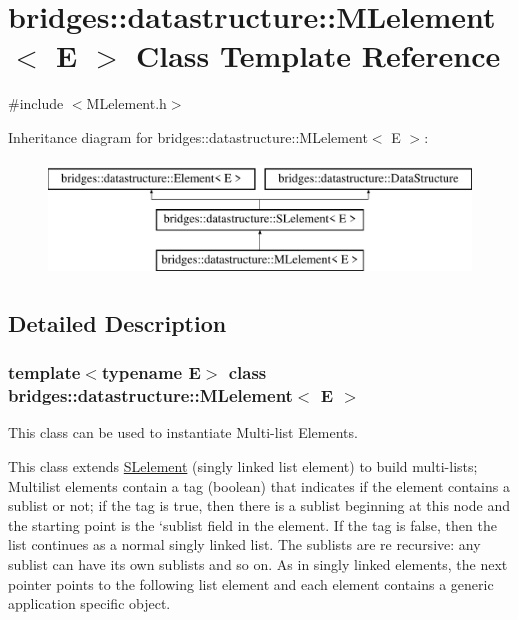 \hypertarget{classbridges_1_1datastructure_1_1_m_lelement}{}\section{bridges\+:\+:datastructure\+:\+:M\+Lelement$<$ E $>$ Class Template Reference}
\label{classbridges_1_1datastructure_1_1_m_lelement}


{\ttfamily \#include $<$M\+Lelement.\+h$>$}

Inheritance diagram for bridges\+:\+:datastructure\+:\+:M\+Lelement$<$ E $>$\+:\begin{figure}[H]
\begin{center}
\leavevmode
\includegraphics[height=3.000000cm]{classbridges_1_1datastructure_1_1_m_lelement}
\end{center}
\end{figure}


\subsection{Detailed Description}
\subsubsection*{template$<$typename E$>$\newline
class bridges\+::datastructure\+::\+M\+Lelement$<$ E $>$}

This class can be used to instantiate Multi-\/list Elements. 

This class extends \hyperlink{classbridges_1_1datastructure_1_1_s_lelement}{S\+Lelement} (singly linked list element) to build multi-\/lists; Multilist elements contain a tag (boolean) that indicates if the element contains a sublist or not; if the tag is true, then there is a sublist beginning at this node and the starting point is the `sublist\textquotesingle{} field in the element. If the tag is false, then the list continues as a normal singly linked list. The sublists are re recursive\+: any sublist can have its own sublists and so on. As in singly linked elements, the next pointer points to the following list element and each element contains a generic application specific object.

